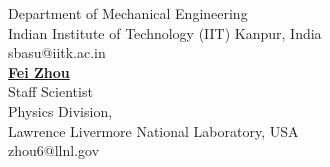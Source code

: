 \documentclass[margin,line]{resume}
\begin{document}
\begin{resume}
\begin{minipage}[t]{0.5\textwidth}
        Department of Mechanical Engineering\\
        Indian Institute of Technology (IIT) Kanpur, India\\
        sbasu@iitk.ac.in\\[1em]
        \href{https://people.llnl.gov/zhou6}{\textbf{\textsf{Fei Zhou}}}\\
        Staff Scientist\\
        Physics Division,\\
        Lawrence Livermore National Laboratory, USA\\
        zhou6@llnl.gov\\[1em]
    \end{minipage}

\end{resume}
\end{document}
